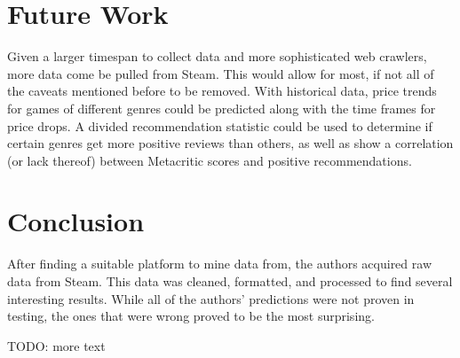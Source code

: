 \documentclass[letterpaper,10pt,twocolumn]{article}
\begin{document}

\section{Future Work}

Given a larger timespan to collect data and more sophisticated web crawlers,
more data come be pulled from Steam. This would allow for most, if not all of
the caveats mentioned before to be removed. With historical data, price
trends for games of different genres could be predicted along with the time
frames for price drops. A divided recommendation statistic could be used to
determine if certain genres get more positive reviews than others, as well as
show a correlation (or lack thereof) between Metacritic scores and positive
recommendations.


\section{Conclusion}

After finding a suitable platform to mine data from, the authors acquired raw
data from Steam. This data was cleaned, formatted, and processed to find
several interesting results. While all of the authors' predictions were not
proven in testing, the ones that were wrong proved to be the most surprising.

TODO: more text


\nocite{*}                                 %
\printbibliography

\end{document}
